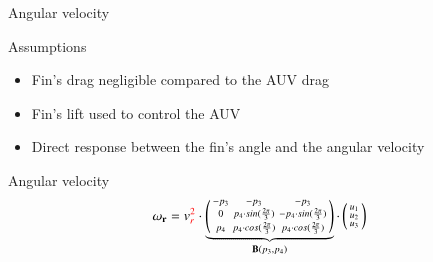 \documentclass[10pt, xcolor={usenames, dvipsnames}]{beamer}
\begin{document}
    \begin{frame}{Angular velocity}
        \centering
        \begin{minipage}{0.8\textwidth}
            \begin{block}{Assumptions}
                \vspace{0.2cm}
                \begin{itemize}
                    \item Fin's drag negligible compared to the AUV drag
                    \item Fin's lift used to control the AUV
                    \item Direct response between the fin's angle and the angular velocity
                \end{itemize}
            \end{block}
            \begin{block}{Angular velocity}
                \begin{equation}
                    \mathbf{\omega_r} = v_r^{\color{red}{2}} \cdot 
                        \underbrace{
                            \left(
                            \begin{smallmatrix}
                                -p_3 & -p_3 & -p_3 \\
                                0 & p_4 \cdot sin(\frac{2\pi}{3}) & -p_4 \cdot sin(\frac{2\pi}{3}) \\
                                p_4 & p_4 \cdot cos(\frac{2\pi}{3}) & p_4 \cdot cos(\frac{2\pi}{3})
                            \end{smallmatrix}
                            \right)
                        }_{\mathbf{B}(p_3, p_4)} \cdot \left(\begin{smallmatrix}u_1\\ u_2\\ u_3\end{smallmatrix}\right)
                \end{equation}
            \end{block}
        \end{minipage}
    \end{frame}
\end{document}
